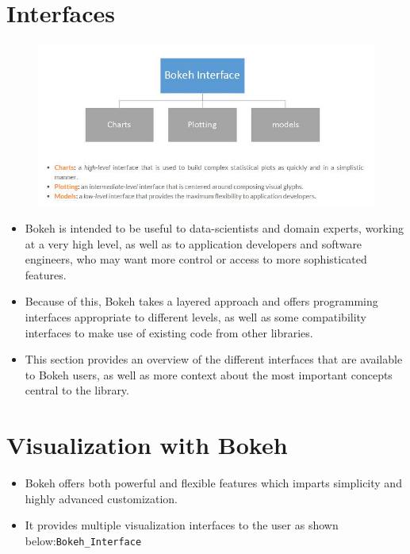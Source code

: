 \documentclass[12pt, a4paper]{report}
\begin{document}
\section*{Interfaces}
\begin{figure}[h!]
	\centering
	\includegraphics[width=1.1\linewidth]{images/00-Interfaces}
\end{figure}
\begin{itemize}
	\item Bokeh is intended to be useful to data-scientists and domain experts, working at a very high level, as well as to application developers and software engineers, who may want more control or access to more sophisticated features. 
	\item Because of this, Bokeh takes a layered approach and offers programming interfaces appropriate to different levels, as well as some compatibility interfaces to make use of existing code from other libraries. 
	
	\item This section provides an overview of the different interfaces that are available to Bokeh users, as well as more context about the most important concepts central to the library. 
\end{itemize}



\newpage

\section*{Visualization with Bokeh}
\begin{itemize}
	\item Bokeh offers both powerful and flexible features which imparts simplicity and highly advanced customization. 
	
	
	
	\item It provides multiple visualization interfaces to the user as shown below:\texttt{Bokeh\_Interface}
\end{itemize}
\end{document}
